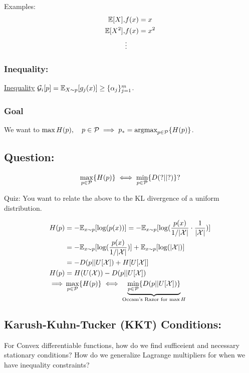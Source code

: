 Examples:
\begin{align*}
      \mathbb{E}[X],& f(x) = x \\
    \mathbb{E}[X^2],& f(x) = x^2 \\
    &\vdots
\end{align*}


\subsubsection{Inequality:}
\underline{Inequality} $\mathcal{G}_i[p] = \mathbb{E}_{X\sim p}[g_j(x)]\geq\{\alpha_j\}_{j=1}^m$.

\subsubsection{Goal}
We want to $\max H(p), \quad p\in\mathcal{P}\implies p_\ast = 
\displaystyle\textnormal{argmax}_{p\in\mathcal{P}} \{H(p)\}$.

\subsection{Question:}
\begin{equation}
    \max_{p\in\mathcal{P}} \{H(p)\} \iff \min_{p\in\mathcal{P}} \{D(? || ?)\}?
\end{equation}
\begin{important}
Quiz: You want to relate the above to the KL divergence of a uniform distribution.
\end{important}
\begin{align*}
    H(p) &= -\mathbb{E}_{x\sim p}[\log(p(x))]
    = -\mathbb{E}_{x\sim p}[\log(\frac{p(x)}{1/|\mathcal{X}|} \cdot \frac1{|\mathcal{X}|})]
    \\
    &= -\mathbb{E}_{x\sim p}[\log(\frac{p(x)}{1/|\mathcal{X}|})] + \mathbb{E}_{x\sim p}[\log(|\mathcal{X}|)] \\
    &= -D(p||U[\mathcal{X}]) + H[U[\mathcal{X}]] \\
H(p) &= H(U(\mathcal{X})) - D(p || U[\mathcal{X}]) \\
\implies &\max_{p\in\mathcal{P}} \{H(p)\} \iff \underbrace{\min_{p\in\mathcal{P}} \{D(p || U[\mathcal{X}])\}}_{\text{Occam's Razor for $\max H$}}
\end{align*}

\subsection{Karush-Kuhn-Tucker (KKT) Conditions:}
For Convex differentiable functions, how do we find sufficeient and necessary stationary conditions? How do we generalize Lagrange multipliers for when we have inequality constraints?

